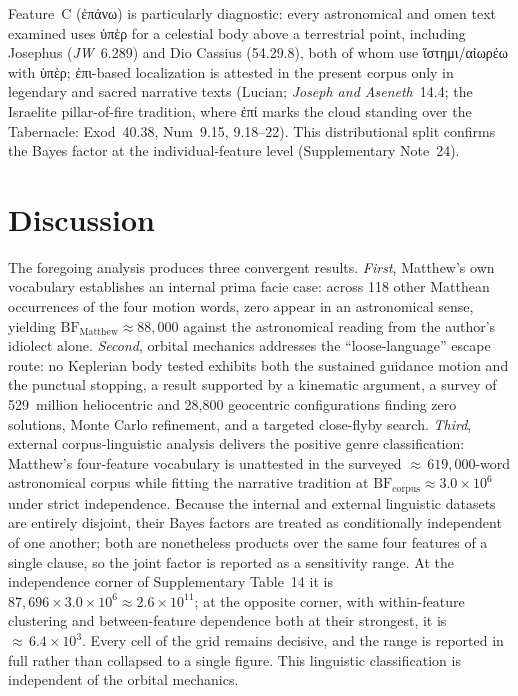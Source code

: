 \documentclass[sn-nature]{sn-jnl}
\newcommand{\grk}[1]{{\fontencoding{LGR}\selectfont #1}}
\newcommand{\grk}[1]{{\greekfont #1}}
\begin{document}
Feature~C (\grk{ἐπάνω}) is particularly diagnostic: every astronomical and
omen text examined uses \grk{ὑπὲρ} for a celestial body above a terrestrial
point, including Josephus (\textit{JW}~6.289) and Dio Cassius (54.29.8),
both of whom use \grk{ἵστημι}/\grk{αἰωρέω} with \grk{ὑπὲρ};
\grk{ἐπι}-based localization is attested in the present corpus only in
legendary and sacred narrative texts (Lucian; \textit{Joseph and Aseneth}~14.4;
the Israelite pillar-of-fire tradition, where \grk{ἐπί} marks the cloud
standing over the Tabernacle: Exod~40.38, Num~9.15, 9.18--22). This
distributional split confirms the Bayes factor at the individual-feature level
(Supplementary Note~24).

\section{Discussion}\label{sec:discussion}

The foregoing analysis produces three convergent results.
\textit{First}, Matthew's own vocabulary establishes an internal prima facie
case: across 118 other Matthean occurrences of the four motion words, zero
appear in an astronomical sense, yielding $\mathrm{BF}_\text{Matthew} \approx
88{,}000$ against the astronomical reading from the author's idiolect alone.
\textit{Second}, orbital mechanics addresses the ``loose-language'' escape route:
no Keplerian body tested exhibits both the sustained guidance motion and the
punctual stopping, a result supported by a kinematic argument, a survey of
529~million heliocentric and 28,800 geocentric configurations finding zero
solutions, Monte Carlo refinement, and a targeted close-flyby search.
\textit{Third}, external corpus-linguistic analysis delivers the positive
genre classification: Matthew's four-feature vocabulary is unattested in
the surveyed ${\approx}\,619{,}000$-word astronomical corpus while fitting the
narrative tradition at $\mathrm{BF}_\text{corpus} \approx 3.0\times10^{6}$
under strict independence. Because the internal and external linguistic
datasets are entirely disjoint, their Bayes factors are treated as
conditionally independent of one another; both are nonetheless products over
the same four features of a single clause, so the joint factor is reported as
a sensitivity range. At the independence corner of Supplementary
Table~14 it is $87{,}696 \times 3.0\times10^{6} \approx
2.6\times10^{11}$; at the opposite corner, with within-feature clustering and
between-feature dependence both at their strongest, it is
${\approx}\,6.4\times10^{3}$. Every cell of the grid remains decisive, and
the range is reported in full rather than collapsed to a single figure.
This linguistic classification is independent of the orbital mechanics.
\end{document}
